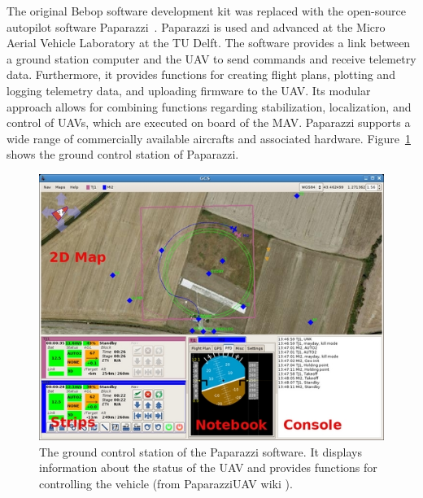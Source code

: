 \documentclass[11pt]{report}
\begin{document}
The original Bebop software development kit was replaced with the
open-source autopilot software
Paparazzi~\cite{brisset2006paparazzi}. Paparazzi is used and advanced
at the Micro Aerial Vehicle Laboratory at the TU Delft. The software
provides a link between a ground station computer and the UAV to send
commands and receive telemetry data. Furthermore, it provides functions
for creating flight plans, plotting and logging telemetry data, and
uploading firmware to the UAV. Its modular approach allows for
combining functions regarding stabilization, localization, and control
of UAVs, which are executed on board of the MAV. Paparazzi supports a
wide range of commercially available aircrafts and associated
hardware.
Figure~\ref{fig:gcs} shows the ground control station of Paparazzi.
\begin{figure}[t]
\begin{center}
\includegraphics[width=0.7\columnwidth]{Gcs}
\caption{{\label{fig:gcs} The ground control station of the Paparazzi
    software. It displays information about the status of the UAV and
    provides functions for controlling the vehicle (from PaparazziUAV
    wiki \cite{paparazzi}).%
  }}
\end{center}
\end{figure}
\end{document}
